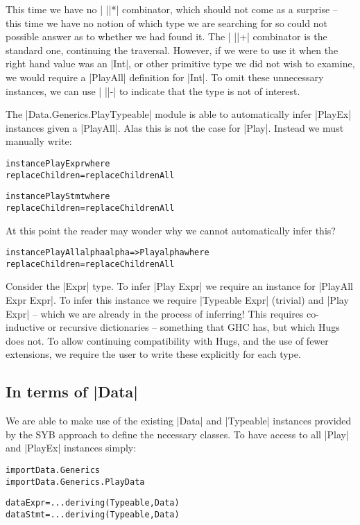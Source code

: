 \documentclass[preprint]{sigplanconf}
\newenvironment{code}{\begin{alltt}\small}{\end{alltt}}
\begin{document}
This time we have no | ||*| combinator, which should not come as a surprise -- this time we have no notion of which type we are searching for so could not possible answer as to whether we had found it. The | ||+| combinator is the standard one, continuing the traversal. However, if we were to use it when the right hand value was an |Int|, or other primitive type we did not wish to examine, we would require a |PlayAll| definition for |Int|. To omit these unnecessary instances, we can use | ||-| to indicate that the type is not of interest.

The |Data.Generics.PlayTypeable| module is able to automatically infer |PlayEx| instances given a |PlayAll|. Alas this is not the case for |Play|. Instead we must manually write:

\begin{code}
instance Play Expr where
    replaceChildren = replaceChildrenAll

instance Play Stmt where
    replaceChildren = replaceChildrenAll
\end{code}

At this point the reader may wonder why we cannot automatically infer this?

\begin{code}
instance PlayAll alpha alpha => Play alpha where
    replaceChildren = replaceChildrenAll
\end{code}

Consider the |Expr| type. To infer |Play Expr| we require an instance for |PlayAll Expr Expr|. To infer this instance we require |Typeable Expr| (trivial) and |Play Expr| -- which we are already in the process of inferring! This requires co-inductive or recursive dictionaries -- something that GHC has, but which Hugs does not. To allow continuing compatibility with Hugs, and the use of fewer extensions, we require the user to write these explicitly for each type.


\subsection{In terms of |Data|}

We are able to make use of the existing |Data| and |Typeable| instances provided by the SYB approach to define the necessary classes. To have access to all |Play| and |PlayEx| instances simply:

\begin{code}
import Data.Generics
import Data.Generics.PlayData

data Expr  = ... \? \? deriving (Typeable, Data)
data Stmt  = ... \? \? deriving (Typeable, Data)
\end{code}
\end{document}
